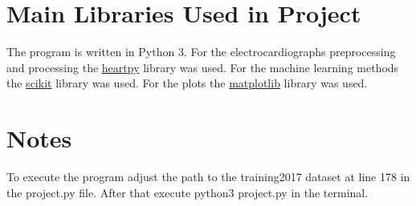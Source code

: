 \documentclass[12pt, a4paper]{article}
\begin{document}
\section{Main Libraries Used in Project}
The program is written in Python 3. For the electrocardiographs preprocessing and processing the \href{https://pypi.org/project/heartpy}{heartpy} library was used. For the machine learning methods the \href{https://scikit-learn.org/}{scikit} library was used. For the plots the \href{https://matplotlib.org/}{matplotlib} library was used.

\section{Notes}
To execute the program adjust the path to the training2017 dataset at line 178 in the project.py file. After that execute python3 project.py in the terminal.
\end{document}
